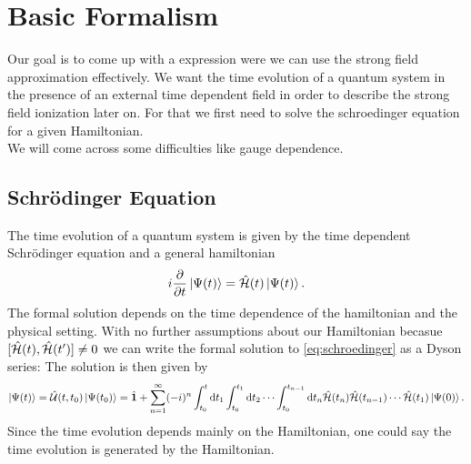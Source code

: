 \section{Basic Formalism}
Our goal is to come up with a expression were we can use the strong field approximation effectively.
We want the time evolution of a quantum system in the presence of an external time dependent field in order to describe the strong field ionization later on.
For that we first need to solve the schroedinger equation for a given Hamiltonian.\\
We will come across some difficulties like gauge dependence.

\subsection{Schrödinger Equation}
The time evolution of a quantum system is given by the time dependent Schrödinger equation and a general hamiltonian
\begin{equation}
    i \frac{\partial}{\partial t} \ket{\Psi(t)} = \hat{\mathcal{H}}(t) \ket{\Psi(t)}. \label{eq:schroedinger}
\end{equation}
The formal solution depends on the time dependence of the hamiltonian and the physical setting. 
With no further assumptions about our Hamiltonian becasue $[\hat{\mathcal{H}}(t), \hat{\mathcal{H}}(t')] \neq 0$ we can write the formal solution to \eqref{eq:schroedinger} as a Dyson series:
The solution is then given by 
\begin{equation}
    \ket{\Psi(t)} = \hat{\mathcal{U}}(t,t_0)\ket{\Psi(t_0)} = \hat{\mathbf{1}} + \sum_{n=1}^{\infty} (-i)^n \int_{t_0}^{t} \mathrm{d} t_1 \int_{t_0}^{t_1} \mathrm{d} t_2 \cdots \int_{t_0}^{t_{n-1}} \mathrm{d} t_n \hat{\mathcal{H}}(t_n) \hat{\mathcal{H}}(t_{n-1})\cdots\hat{\mathcal{H}}(t_1) \ket{\Psi(0)}. \label{eq:dyson}
\end{equation}
Since the time evolution depends mainly on the Hamiltonian, one could say the time evolution is generated by the Hamiltonian.





